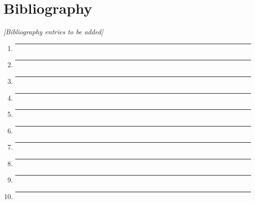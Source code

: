 \documentclass[12pt,a4paper]{article}
\begin{document}
\newpage
\section*{Bibliography}

\vspace{1cm}

\textit{[Bibliography entries to be added]}

\vspace{2cm}

\begin{enumerate}
    \item \rule{12cm}{0.4pt}
    \vspace{0.5cm}
    
    \item \rule{12cm}{0.4pt}
    \vspace{0.5cm}
    
    \item \rule{12cm}{0.4pt}
    \vspace{0.5cm}
    
    \item \rule{12cm}{0.4pt}
    \vspace{0.5cm}
    
    \item \rule{12cm}{0.4pt}
    \vspace{0.5cm}
    
    \item \rule{12cm}{0.4pt}
    \vspace{0.5cm}
    
    \item \rule{12cm}{0.4pt}
    \vspace{0.5cm}
    
    \item \rule{12cm}{0.4pt}
    \vspace{0.5cm}
    
    \item \rule{12cm}{0.4pt}
    \vspace{0.5cm}
    
    \item \rule{12cm}{0.4pt}
\end{enumerate}

\newpage
\appendix
\end{document}
